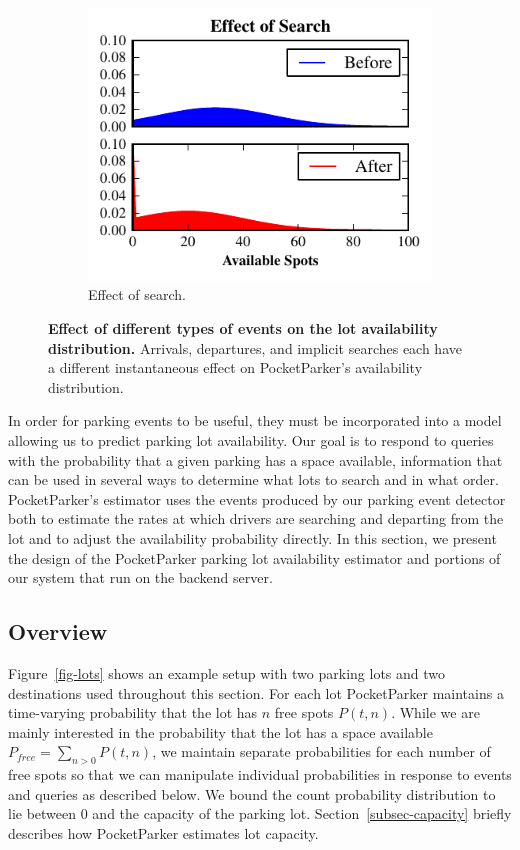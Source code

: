 \begin{figure}
\begin{subfigure}[b]{0.33\textwidth}
    \includegraphics[width=\textwidth]{./figures/search.pdf}
    \caption{Effect of search.}
    \label{fig-examples-search}
  \end{subfigure}
  \caption{\textbf{Effect of different types of events on the lot availability
  distribution.} Arrivals, departures, and implicit searches each have a
  different instantaneous effect on PocketParker's availability distribution.}
  \label{fig-examples}
\end{figure}

In order for parking events to be useful, they must be incorporated into a
model allowing us to predict parking lot availability. Our goal is to respond
to queries with the probability that a given parking has a space available,
information that can be used in several ways to determine what lots to search
and in what order. PocketParker's estimator uses the events produced by our
parking event detector both to estimate the rates at which drivers are
searching and departing from the lot and to adjust the availability
probability directly. In this section, we present the design of the
PocketParker parking lot availability estimator and portions of our system
that run on the backend server.

\subsection{Overview}

Figure~\ref{fig-lots} shows an example setup with two parking lots and two
destinations used throughout this section. For each lot PocketParker
maintains a time-varying probability that the lot has $n$ free spots $P(t,
n)$. While we are mainly interested in the probability that the lot has a
space available $P_{free} = \sum_{n > 0} P(t, n)$, we maintain separate
probabilities for each number of free spots so that we can manipulate
individual probabilities in response to events and queries as described
below. We bound the count probability distribution to lie between 0 and the
capacity of the parking lot. Section~\ref{subsec-capacity} briefly describes
how PocketParker estimates lot capacity.

